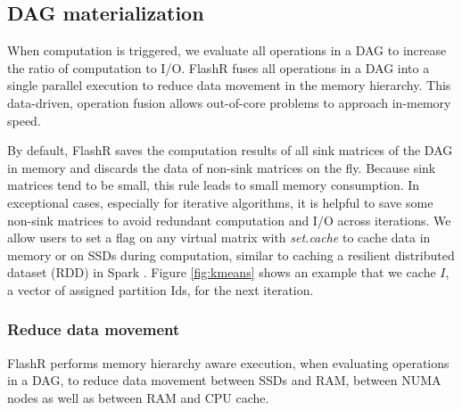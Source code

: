 \subsection{DAG materialization}\label{sec:materialize}
When computation is triggered, we evaluate all operations in a DAG
to increase the ratio of computation to I/O. FlashR fuses all operations in
a DAG into a single parallel execution to reduce data
movement in the memory hierarchy. This data-driven,
operation fusion allows out-of-core problems to approach in-memory speed.

By default, FlashR saves the computation results of all sink matrices of
the DAG in memory and discards the data of non-sink matrices on the fly.
Because sink matrices tend to be small, this rule leads to small memory
consumption. In exceptional cases, especially for iterative algorithms,
it is helpful to save some non-sink matrices to avoid redundant computation
and I/O across iterations. We allow users to
set a flag on any virtual matrix with \textit{set.cache} to
cache data in memory or on SSDs during computation, similar to caching
a resilient distributed dataset (RDD) in Spark \cite{spark}.
Figure \ref{fig:kmeans} shows an example that we cache $I$, a vector of
assigned partition Ids, for the next iteration.

\subsubsection{Reduce data movement}
FlashR performs memory hierarchy aware execution, when evaluating operations
in a DAG, to reduce data movement
between SSDs and RAM, between NUMA nodes as well as between RAM and CPU cache.

